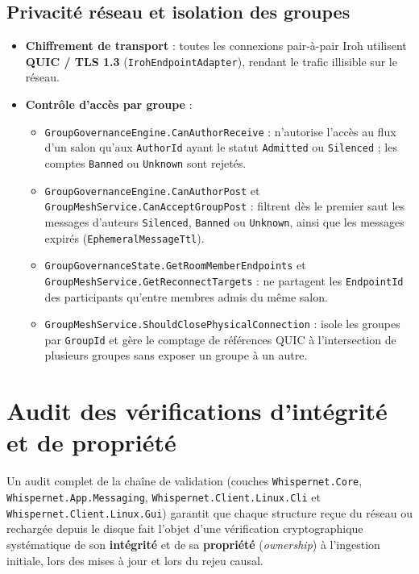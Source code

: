 \documentclass[11pt,a4paper]{article}
\begin{document}
\subsection{Privacité réseau et isolation des groupes}
\begin{itemize}
    \item \textbf{Chiffrement de transport} : toutes les connexions pair-à-pair Iroh utilisent \textbf{QUIC / TLS 1.3} (\texttt{IrohEndpointAdapter}), rendant le trafic illisible sur le réseau.
    \item \textbf{Contrôle d'accès par groupe} :
    \begin{itemize}
        \item \texttt{GroupGovernanceEngine.CanAuthorReceive} : n'autorise l'accès au flux d'un salon qu'aux \texttt{AuthorId} ayant le statut \texttt{Admitted} ou \texttt{Silenced} ; les comptes \texttt{Banned} ou \texttt{Unknown} sont rejetés.
        \item \texttt{GroupGovernanceEngine.CanAuthorPost} et \texttt{GroupMeshService.CanAcceptGroupPost} : filtrent dès le premier saut les messages d'auteurs \texttt{Silenced}, \texttt{Banned} ou \texttt{Unknown}, ainsi que les messages expirés (\texttt{EphemeralMessageTtl}).
        \item \texttt{GroupGovernanceState.GetRoomMemberEndpoints} et \texttt{GroupMeshService.GetReconnectTargets} : ne partagent les \texttt{EndpointId} des participants qu'entre membres admis du même salon.
        \item \texttt{GroupMeshService.ShouldClosePhysicalConnection} : isole les groupes par \texttt{GroupId} et gère le comptage de références QUIC à l'intersection de plusieurs groupes sans exposer un groupe à un autre.
    \end{itemize}
\end{itemize}

\section{Audit des vérifications d'intégrité et de propriété}

Un audit complet de la chaîne de validation (couches \texttt{Whispernet.Core}, \texttt{Whispernet.App.Messaging}, \texttt{Whispernet.Client.Linux.Cli} et \texttt{Whispernet.Client.Linux.Gui}) garantit que chaque structure reçue du réseau ou rechargée depuis le disque fait l'objet d'une vérification cryptographique systématique de son \textbf{intégrité} et de sa \textbf{propriété} (\emph{ownership}) à l'ingestion initiale, lors des mises à jour et lors du rejeu causal.
\end{document}
